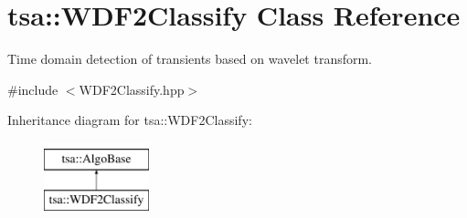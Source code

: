 \hypertarget{classtsa_1_1_w_d_f2_classify}{}\section{tsa\+:\+:W\+D\+F2\+Classify Class Reference}
\label{classtsa_1_1_w_d_f2_classify}


Time domain detection of transients based on wavelet transform.  




{\ttfamily \#include $<$W\+D\+F2\+Classify.\+hpp$>$}

Inheritance diagram for tsa\+:\+:W\+D\+F2\+Classify\+:\begin{figure}[H]
\begin{center}
\leavevmode
\includegraphics[height=2.000000cm]{classtsa_1_1_w_d_f2_classify}
\end{center}
\end{figure}
